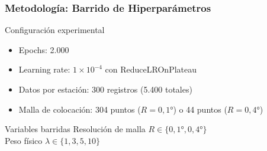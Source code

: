 \begin{frame}[fragile]
  \frametitle{Metodología: Barrido de Hiperparámetros}
  
  \begin{block}{Configuración experimental}
    \begin{itemize}
      \item Epochs: 2.000
      \item Learning rate: $1 \times 10^{-4}$ con ReduceLROnPlateau
      \item Datos por estación: 300 registros (5.400 totales)
      \item Malla de colocación: 304 puntos ($R = 0{,}1°$) o 44 puntos ($R = 0{,}4°$)
    \end{itemize}
  \end{block}
  
  \begin{block}{Variables barridas}
    Resolución de malla $R \in \{0{,}1°, 0{,}4°\}$\\
    Peso físico $\lambda \in \{1, 3, 5, 10\}$
  \end{block}
  
\end{frame}
